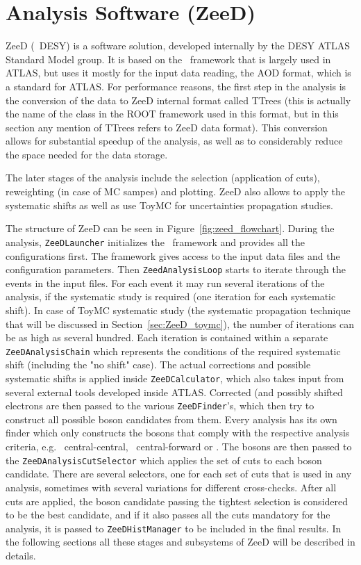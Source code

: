 \chapter{Analysis Software (ZeeD)}
\label{sec:ZeeD}
ZeeD (\Zee\ DESY) is a software solution, developed internally by the DESY ATLAS Standard Model group. It is based on the \Athena\ framework that is largely used in ATLAS, but uses it mostly for the input data reading, the AOD format, which is a standard for ATLAS. For performance reasons, the first step in the analysis is the conversion of the data to ZeeD internal format called TTrees (this is actually the name of the class in the ROOT framework used in this format, but in this section any mention of TTrees refers to ZeeD data format). This conversion allows for substantial speedup of the analysis, as well as to considerably reduce the space needed for the data storage.

The later stages of the analysis include the selection (application of cuts), reweighting (in case of MC sampes) and plotting. ZeeD also allows to apply the systematic shifts as well as use ToyMC for uncertainties propagation studies.

The structure of ZeeD can be seen in Figure~\ref{fig:zeed_flowchart}. During the analysis, \texttt{ZeeDLauncher} initializes the \Athena\ framework and provides all the configurations first. The framework gives access to the input data files and the configuration parameters. Then \texttt{ZeedAnalysisLoop} starts to iterate through the events in the input files. For each event it may run several iterations of the analysis, if the systematic study is required (one iteration for each systematic shift). In case of ToyMC systematic study (the systematic propagation technique that will be discussed in Section~\ref{sec:ZeeD_toymc}), the number of iterations can be as high as several hundred. Each iteration is contained within a separate \texttt{ZeeDAnalysisChain} which represents the conditions of the required systematic shift (including the "no shift" case). The actual corrections and possible systematic shifts is applied inside \texttt{ZeeDCalculator}, which also takes input from several external tools developed inside ATLAS. Corrected (and possibly shifted electrons are then passed to the various \texttt{ZeeDFinder}'s, which then try to construct all possible boson candidates from them. Every analysis has its own finder which only constructs the bosons that comply with the respective analysis criteria, e.g. \Zee\ central-central, \Zee\ central-forward or \Wenu. The bosons are then passed to the \texttt{ZeeDAnalysisCutSelector} which applies the set of cuts to each boson candidate. There are several selectors, one for each set of cuts that is used in any analysis, sometimes with several variations for different cross-checks. After all cuts are applied, the boson candidate passing the tightest selection is considered to be the best candidate, and if it also passes all the cuts mandatory for the analysis, it is passed to \texttt{ZeeDHistManager} to be included in the final results. In the following sections all these stages and subsystems of ZeeD will be described in details.

